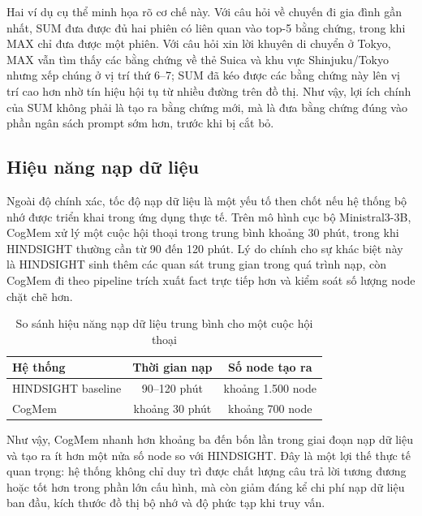 \documentclass[../main.tex]{subfiles}
\begin{document}
Hai ví dụ cụ thể minh họa rõ cơ chế này. Với câu hỏi về chuyến đi gia đình gần nhất, SUM đưa được đủ hai phiên có liên quan vào top-5 bằng chứng, trong khi MAX chỉ đưa được một phiên. Với câu hỏi xin lời khuyên di chuyển ở Tokyo, MAX vẫn tìm thấy các bằng chứng về thẻ Suica và khu vực Shinjuku/Tokyo nhưng xếp chúng ở vị trí thứ 6--7; SUM đã kéo được các bằng chứng này lên vị trí cao hơn nhờ tín hiệu hội tụ từ nhiều đường trên đồ thị. Như vậy, lợi ích chính của SUM không phải là tạo ra bằng chứng mới, mà là đưa bằng chứng đúng vào phần ngân sách prompt sớm hơn, trước khi bị cắt bỏ.

\subsection{Hiệu năng nạp dữ liệu}

Ngoài độ chính xác, tốc độ nạp dữ liệu là một yếu tố then chốt nếu hệ thống bộ nhớ được triển khai trong ứng dụng thực tế. Trên mô hình cục bộ Ministral3-3B, CogMem xử lý một cuộc hội thoại trong trung bình khoảng 30 phút, trong khi HINDSIGHT thường cần từ 90 đến 120 phút. Lý do chính cho sự khác biệt này là HINDSIGHT sinh thêm các quan sát trung gian trong quá trình nạp, còn CogMem đi theo pipeline trích xuất fact trực tiếp hơn và kiểm soát số lượng node chặt chẽ hơn.

\begin{table}[H]
\centering
\caption{So sánh hiệu năng nạp dữ liệu trung bình cho một cuộc hội thoại}
\label{tab:retain_efficiency_comparison}
\small
\begin{tabularx}{\linewidth}{@{}p{5.5cm}cc@{}}
\toprule
\textbf{Hệ thống} & \textbf{Thời gian nạp} & \textbf{Số node tạo ra} \\
\midrule
HINDSIGHT baseline & 90--120 phút & khoảng 1.500 node \\
CogMem & khoảng 30 phút & khoảng 700 node \\
\bottomrule
\end{tabularx}
\end{table}

Như vậy, CogMem nhanh hơn khoảng ba đến bốn lần trong giai đoạn nạp dữ liệu và tạo ra ít hơn một nửa số node so với HINDSIGHT. Đây là một lợi thế thực tế quan trọng: hệ thống không chỉ duy trì được chất lượng câu trả lời tương đương hoặc tốt hơn trong phần lớn cấu hình, mà còn giảm đáng kể chi phí nạp dữ liệu ban đầu, kích thước đồ thị bộ nhớ và độ phức tạp khi truy vấn.

\end{document}
